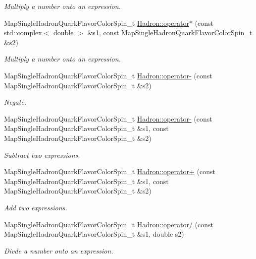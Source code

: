 \begin{DoxyCompactItemize}
\begin{DoxyCompactList}\small\item\em Multiply a number onto an expression. \end{DoxyCompactList}\item 
Map\+Single\+Hadron\+Quark\+Flavor\+Color\+Spin\+\_\+t \mbox{\hyperlink{namespaceHadron_afeecee88605be038ceda273e796e53fd}{Hadron\+::operator$\ast$}} (const std\+::complex$<$ double $>$ \&s1, const Map\+Single\+Hadron\+Quark\+Flavor\+Color\+Spin\+\_\+t \&s2)
\begin{DoxyCompactList}\small\item\em Multiply a number onto an expression. \end{DoxyCompactList}\item 
Map\+Single\+Hadron\+Quark\+Flavor\+Color\+Spin\+\_\+t \mbox{\hyperlink{namespaceHadron_a2cee38a50a5e1ed5fbff1d9e4df08bdd}{Hadron\+::operator-\/}} (const Map\+Single\+Hadron\+Quark\+Flavor\+Color\+Spin\+\_\+t \&s2)
\begin{DoxyCompactList}\small\item\em Negate. \end{DoxyCompactList}\item 
Map\+Single\+Hadron\+Quark\+Flavor\+Color\+Spin\+\_\+t \mbox{\hyperlink{namespaceHadron_ad7c424c3185becdcc1423060951ff98e}{Hadron\+::operator-\/}} (const Map\+Single\+Hadron\+Quark\+Flavor\+Color\+Spin\+\_\+t \&s1, const Map\+Single\+Hadron\+Quark\+Flavor\+Color\+Spin\+\_\+t \&s2)
\begin{DoxyCompactList}\small\item\em Subtract two expressions. \end{DoxyCompactList}\item 
Map\+Single\+Hadron\+Quark\+Flavor\+Color\+Spin\+\_\+t \mbox{\hyperlink{namespaceHadron_a168571d9c710321169dad756440c1952}{Hadron\+::operator+}} (const Map\+Single\+Hadron\+Quark\+Flavor\+Color\+Spin\+\_\+t \&s1, const Map\+Single\+Hadron\+Quark\+Flavor\+Color\+Spin\+\_\+t \&s2)
\begin{DoxyCompactList}\small\item\em Add two expressions. \end{DoxyCompactList}\item 
Map\+Single\+Hadron\+Quark\+Flavor\+Color\+Spin\+\_\+t \mbox{\hyperlink{namespaceHadron_ae43d51b030dac0dd81991cf7c401507a}{Hadron\+::operator/}} (const Map\+Single\+Hadron\+Quark\+Flavor\+Color\+Spin\+\_\+t \&s1, double s2)
\begin{DoxyCompactList}\small\item\em Divde a number onto an expression. \end{DoxyCompactList}\item 

\end{DoxyCompactItemize}
